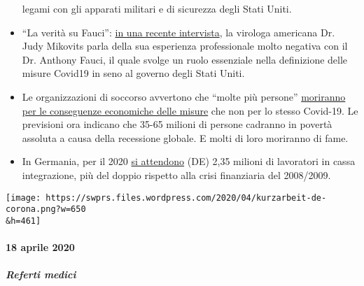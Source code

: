 \begin{itemize}
  legami con gli apparati militari e di sicurezza degli Stati Uniti.
\item
  ``La verità su Fauci'':
  \href{https://childrenshealthdefense.org/news/the-truth-about-fauci-featuring-dr-judy-mikovits/}{in
  una recente intervista}, la virologa americana Dr. Judy Mikovits parla
  della sua esperienza professionale molto negativa con il Dr. Anthony
  Fauci, il quale svolge un ruolo essenziale nella definizione delle
  misure Covid19 in seno al governo degli Stati Uniti.
\item
  Le organizzazioni di soccorso avvertono che ``molte più persone''
  \href{https://www.welt.de/wirtschaft/article207092745/Corona-Pandemie-Rezession-beschert-der-Welt-die-noch-groessere-Katastrophe.html}{moriranno
  per le conseguenze economiche delle misure} che non per lo stesso
  Covid-19. Le previsioni ora indicano che 35-65 milioni di persone
  cadranno in povertà assoluta a causa della recessione globale. E molti
  di loro moriranno di fame.
\item
  In Germania, per il 2020
  \href{https://www.boeckler.de/pdf/p_wsi_pb_38_2020.pdf}{si attendono}
  (DE) 2,35 milioni di lavoratori in cassa integrazione, più del doppio
  rispetto alla crisi finanziaria del 2008/2009.
\end{itemize}

\texttt{[image: https://swprs.files.wordpress.com/2020/04/kurzarbeit-de-corona.png?w=650\\\&h=461]}

\hypertarget{18-aprile-2020}{%
\paragraph{18 aprile 2020}\label{18-aprile-2020}}

\hypertarget{referti-medici}{%
\subparagraph{\texorpdfstring{\textbf{Referti
medici}}{Referti medici}}\label{referti-medici}}


